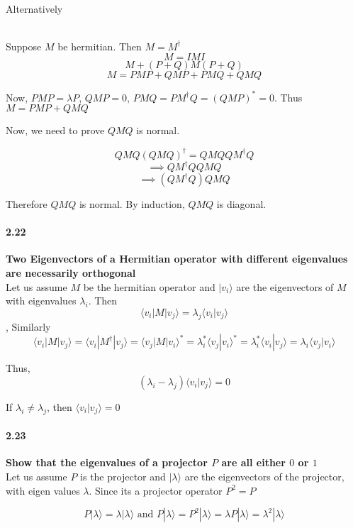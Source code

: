 \\

Alternatively

\\

Suppose $M$ be hermitian. Then $M = M^{\dagger}$
$$ M = IMI$$
$$ M + (P+Q)M(P+Q)$$
$$ M = PMP + QMP +PMQ + QMQ$$

Now, $PMP = \lambda P$, $QMP = 0 $, $PMQ = PM^{\dagger}Q = (QMP)^{*} = 0 $. Thus $M = PMP + QMQ$

Now, we need to prove $QMQ $ is normal.

$$ QMQ(QMQ)^{\dagger} = QMQQM^{\dagger}Q$$
$$ \implies QM^{\dagger}QQMQ$$
$$\implies (QM^{\dagger}Q)QMQ$$

Therefore $QMQ$ is normal. By induction, $QMQ$ is diagonal.

\paragraph{2.22} \textbf{Two Eigenvectors of a Hermitian operator with different eigenvalues are necessarily orthogonal}%
\\

Let us assume $M $ be the hermitian operator and $|v_i\rangle$ are the eigenvectors of $M$ with eigenvalues $\lambda_i$. Then
$$ \langle v_i |M |v_j \rangle = \lambda_j \langle v_i | v_j\rangle$$
, Similarly
$$\langle v_i|M|v_j\rangle = \langle v_i | M^{\dagger} | v_j \rangle = \langle v_j | M | v_i \rangle^{*} =  \lambda_i^{*}\langle v_j | v_i \rangle^{*} = \lambda_i^{*}\langle v_i | v_j \rangle = \lambda_i\langle v_j | v_i \rangle$$

Thus,
$$ (\lambda_i - \lambda_j) \langle v_i | v_j \rangle = 0$$

If $\lambda_i \ne \lambda_j$, then  $\langle v_i | v_j\rangle = 0$

\paragraph{2.23} \textbf{Show that the eigenvalues of a projector $P$ are all either $0$ or $1$}%
\\

Let us assume $P$ is the projector and $|\lambda\rangle$ are the eigenvectors of the projector, with eigen values $\lambda$. Since its a projector operator $P^2 = P$

$$ P |\lambda\rangle = \lambda |\lambda\rangle \text{ and } P|\lambda\rangle = P^2|\lambda\rangle = \lambda P |\lambda\rangle = \lambda^2 |\lambda\rangle$$

